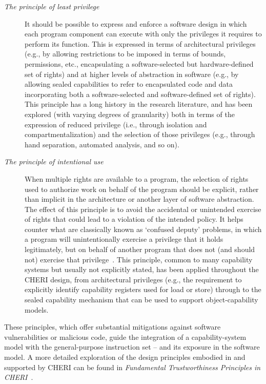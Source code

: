 \begin{description}
\item[\textit{The principle of least privilege}] It should be possible to
  express and enforce a software design in which each program component can execute
  with only the privileges it requires to perform its function.
  This is expressed in terms of architectural privileges (e.g., by allowing
  restrictions to be imposed in terms of bounds, permissions, etc.,
  encapsulating a software-selected but hardware-defined set of rights) and at
  higher levels of abstraction in software (e.g., by allowing sealed
  capabilities to refer to encapsulated code and data incorporating both a
  software-selected and software-defined set of rights).
  This principle has a long history in the research literature, and has been
  explored (with varying degrees of granularity) both in terms of the expression
  of reduced privilege (i.e., through isolation and compartmentalization) and
  the selection of those privileges (e.g., through hand separation, automated
  analysis, and so on).

\item[\textit{The principle of intentional use}]  When multiple rights
  are available to a program, the selection of rights used to authorize work
  on behalf of the program should be explicit, rather than implicit in the
  architecture or another layer of software abstraction.
  The effect of this principle is to avoid the accidental or unintended
  exercise of rights that could lead to a violation of the intended policy.
  It helps counter what are classically known as
  `confused deputy' problems, in which a program will unintentionally exercise
  a privilege that it holds legitimately, but on behalf of another program
  that does not (and should not) exercise that privilege~\cite{Hardy1988}.
  This principle, common to many capability systems but usually not explicitly
  stated, has been applied throughout the CHERI design, from architectural
  privileges (e.g., the requirement to explicitly identify capability
  registers used for load or store) through to the sealed capability mechanism
  that can be used to support object-capability models.
\end{description}

\noindent
These principles, which offer 
substantial mitigations against
 software vulnerabilities or malicious code, guide the integration
of a capability-system model with the general-purpose instruction set -- and
its exposure in the software model.
A more detailed exploration of the design principles embodied in and supported
by CHERI can be found in \textit{Fundamental Trustworthiness Principles in
CHERI}~\cite{neumann2017:cheri-principles}.

